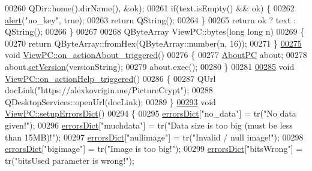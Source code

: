 \begin{DoxyCode}
00260                                          QDir::home().dirName(), &ok);
00261     \textcolor{keywordflow}{if}(text.isEmpty() && ok) \{
00262         \hyperlink{class_view_p_c_a7c467169467789561078abc9d4fe57bd}{alert}(\textcolor{stringliteral}{"no\_key"}, \textcolor{keyword}{true});
00263         \textcolor{keywordflow}{return} QString();
00264     \}
00265     \textcolor{keywordflow}{return} ok ? text : QString();
00266 \}
00267 
00268 QByteArray ViewPC::bytes(\textcolor{keywordtype}{long} \textcolor{keywordtype}{long} n)
00269 \{
00270     \textcolor{keywordflow}{return} QByteArray::fromHex(QByteArray::number(n, 16));
00271 \}
\hypertarget{viewpc_8cpp_source.tex_l00275}{}\hyperlink{class_view_p_c_a09a46da4d492eb3dde88f35dc58c997b}{00275} \textcolor{keywordtype}{void} \hyperlink{class_view_p_c_a09a46da4d492eb3dde88f35dc58c997b}{ViewPC::on\_actionAbout\_triggered}()
00276 \{
00277     \hyperlink{class_about_p_c}{AboutPC} about;
00278     about.\hyperlink{class_about_p_c_aa3815d4826d0c8d87122449537a0a4d5}{setVersion}(versionString);
00279     about.exec();
00280 \}
00281 
\hypertarget{viewpc_8cpp_source.tex_l00285}{}\hyperlink{class_view_p_c_a0d252ff4829260c6c76769fbd24b7cd7}{00285} \textcolor{keywordtype}{void} \hyperlink{class_view_p_c_a0d252ff4829260c6c76769fbd24b7cd7}{ViewPC::on\_actionHelp\_triggered}()
00286 \{
00287     QUrl docLink(\textcolor{stringliteral}{"https://alexkovrigin.me/PictureCrypt"});
00288     QDesktopServices::openUrl(docLink);
00289 \}
\hypertarget{viewpc_8cpp_source.tex_l00293}{}\hyperlink{class_view_p_c_a89236a0bb8760f02e984b85a8571934c}{00293} \textcolor{keywordtype}{void} \hyperlink{class_view_p_c_a89236a0bb8760f02e984b85a8571934c}{ViewPC::setupErrorsDict}()
00294 \{
00295     \hyperlink{class_view_p_c_aaf7f058e5589d65fec72a21abfd5629b}{errorsDict}[\textcolor{stringliteral}{"no\_data"}] = tr(\textcolor{stringliteral}{"No data given!"});
00296     \hyperlink{class_view_p_c_aaf7f058e5589d65fec72a21abfd5629b}{errorsDict}[\textcolor{stringliteral}{"muchdata"}] = tr(\textcolor{stringliteral}{"Data size is too big (must be less than 15MB)!"});
00297     \hyperlink{class_view_p_c_aaf7f058e5589d65fec72a21abfd5629b}{errorsDict}[\textcolor{stringliteral}{"nullimage"}] = tr(\textcolor{stringliteral}{"Invalid / null image!"});
00298     \hyperlink{class_view_p_c_aaf7f058e5589d65fec72a21abfd5629b}{errorsDict}[\textcolor{stringliteral}{"bigimage"}] = tr(\textcolor{stringliteral}{"Image is too big!"});
00299     \hyperlink{class_view_p_c_aaf7f058e5589d65fec72a21abfd5629b}{errorsDict}[\textcolor{stringliteral}{"bitsWrong"}] = tr(\textcolor{stringliteral}{"bitsUsed parameter is wrong!"});

\end{DoxyCode}
